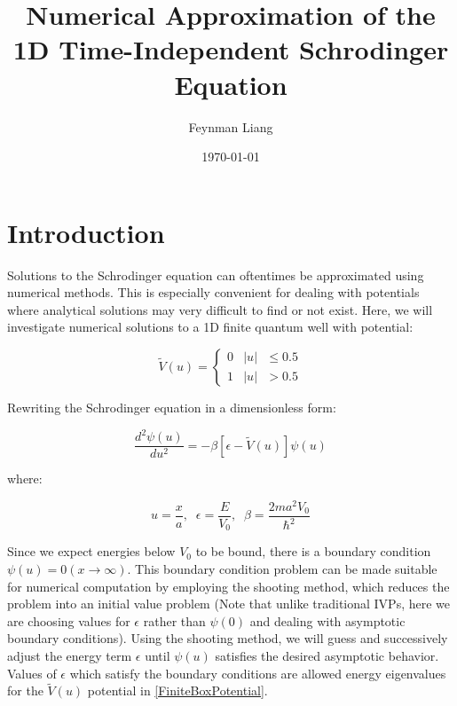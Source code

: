 \documentclass{article}
\title{Numerical Approximation of the 1D Time-Independent Schrodinger Equation}
\author{Feynman Liang}
\date{\today}
\begin{document}
\maketitle

\section{Introduction}
Solutions to the Schrodinger equation can oftentimes be approximated using numerical
methods. This is especially convenient for dealing with potentials where analytical 
solutions may very difficult to find or not exist. Here, we will investigate numerical 
solutions to a 1D finite quantum well with potential:

\begin{equation}\label{FiniteBoxPotential}
    \widetilde{V}(u)=
    \begin{cases} 0 & \text{\(\lvert u\rvert\) $\le 0.5$}
    \\
    1 & \text{\(\lvert u\rvert\) $> 0.5$}
\end{cases}
\end{equation}

Rewriting the Schrodinger equation in a dimensionless form:

\begin{equation}\label{FiniteBoxSchrodinger}
    \frac{d^{2}\psi(u)}{du^{2}} = -\beta\left[\epsilon-\widetilde{V}(u)\right]\psi(u)
\end{equation}

where:

\begin{equation}\label{DimensionlessSubstitutions}
    u = \frac{x}{a},\;\;
    \epsilon = \frac{E}{V_{0}},\;\;
    \beta = \frac{2ma^{2}V_0}{\hbar^2}
\end{equation}

Since we expect energies below $V_0$ to be bound, there is a boundary condition
$\psi(u) = 0 (x \rightarrow \infty)$. This boundary condition problem can be
made suitable for numerical computation by employing the shooting method, which
reduces the problem into an initial value problem (Note that unlike traditional
IVPs, here we are choosing values for $\epsilon$ rather than $\psi(0)$ and
dealing with asymptotic boundary conditions). Using the shooting method, we
will guess and successively adjust the energy term $\epsilon$ until $\psi(u)$
satisfies the desired asymptotic behavior. Values of $\epsilon$ which satisfy
the boundary conditions are allowed energy eigenvalues for the
$\widetilde{V}(u)$ potential
in \eqref{FiniteBoxPotential}.
\end{document}
